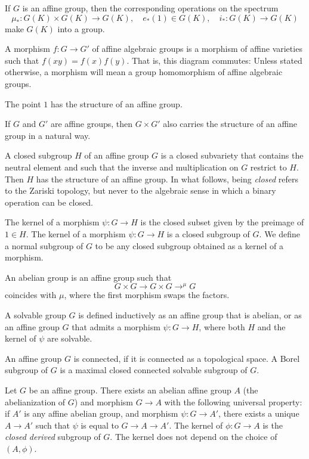 If $G$ is an affine group, then the corresponding operations
on the spectrum
\[
\mu_*:G(K)\times G(K)\to G(K),\quad e_*(1)\in G(K),\quad i_*:G(K)\to G(K)
\]
make $G(K)$ into a group.


A morphism $f:G\to G'$ of affine algebraic groups is a morphism
of affine varieties such that $f(x y) = f(x) f(y)$.  That is,
this diagram commutes:
Unless stated otherwise, a morphism will mean a group homomorphism of
affine algebraic groups.

The point $1$ has the structure of an affine group.

If $G$ and $G'$ are affine groups, then $G \times G'$ also
carries the structure of an affine group in a natural way.

A closed subgroup $H$ of an affine group $G$ is a closed subvariety
that contains the neutral element and such that the inverse and
multiplication on $G$ restrict to $H$.  Then $H$ has the structure of
an affine group.  In what follows, being {\it closed} refers to the
Zariski topology, but never to the algebraic sense in which a binary
operation can be closed.

The kernel of a morphism $\psi:G\to H$ is the closed subset given by
the preimage of $1\in H$.  The kernel of a morphism $\psi:G\to H$ is a
closed subgroup of $G$.  We define a normal subgroup of $G$ to be any
closed subgroup obtained as a kernel of a morphism.

An abelian group is an affine group such that
\[
G \times G \to G \times G \to^\mu G
\]
coincides with $\mu$, where the first morphism swaps the factors.

A solvable group $G$ is defined inductively as an affine group that is
abelian, or as an affine group $G$ that admits a morphism $\psi:G\to
H$, where both $H$ and the kernel of $\psi$ are solvable.

An affine group $G$ is connected, if it is connected as a topological
space.
A Borel subgroup of $G$ is a maximal closed connected solvable
subgroup of $G$.

Let $G$ be an affine group.  There exists an abelian affine group $A$
(the abelianization of $G$) and morphism $G\to A$ with the following
universal property: if $A'$ is any affine abelian group, and morphism
$\psi: G \to A'$, there exists a unique $A\to A'$ such that $\psi$ is
equal to $G\to A \to A'$.  The kernel of $\phi:G\to A$ is the
{\it closed derived} subgroup of $G$.   The kernel does not depend
on the choice of $(A,\phi)$.

